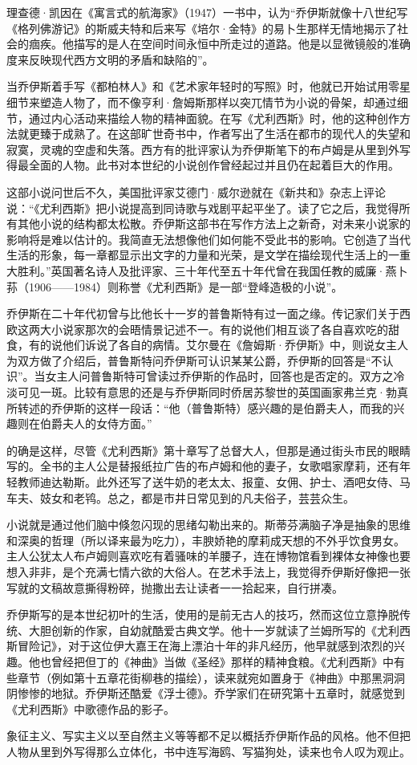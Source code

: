 \par 理查德·凯因在《寓言式的航海家》（1947）一书中，认为“乔伊斯就像十八世纪写《格列佛游记》的斯威夫特和后来写《培尔·金特》的易卜生那样无情地揭示了社会的痼疾。他描写的是人在空间时间永恒中所走过的道路。他是以显微镜般的准确度来反映现代西方文明的矛盾和缺陷的”。
\par 当乔伊斯着手写《都柏林人》和《艺术家年轻时的写照》时，他就已开始试用零星细节来塑造人物了，而不像亨利·詹姆斯那样以突兀情节为小说的骨架，却通过细节，通过内心活动来描绘人物的精神面貌。在写《尤利西斯》时，他的这种创作方法就更臻于成熟了。在这部旷世奇书中，作者写出了生活在都市的现代人的失望和寂寞，灵魂的空虚和失落。西方有的批评家认为乔伊斯笔下的布卢姆是从里到外写得最全面的人物。此书对本世纪的小说创作曾经起过并且仍在起着巨大的作用。
\par 这部小说问世后不久，美国批评家艾德门·威尔逊就在《新共和》杂志上评论说：“《尤利西斯》把小说提高到同诗歌与戏剧平起平坐了。读了它之后，我觉得所有其他小说的结构都太松散。乔伊斯这部书在写作方法上之新奇，对未来小说家的影响将是难以估计的。我简直无法想像他们如何能不受此书的影响。它创造了当代生活的形象，每一章都显示出文字的力量和光荣，是文学在描绘现代生活上的一重大胜利。”英国著名诗人及批评家、三十年代至五十年代曾在我国任教的威廉·燕卜荪（1906——1984）则称誉《尤利西斯》是一部“登峰造极的小说”。
\par 乔伊斯在二十年代初曾与比他长十一岁的普鲁斯特有过一面之缘。传记家们关于西欧这两大小说家那次的会晤情景记述不一。有的说他们相互谈了各自喜欢吃的甜食，有的说他们诉说了各自的病情。艾尔曼在《詹姆斯·乔伊斯》中，则说女主人为双方做了介绍后，普鲁斯特问乔伊斯可认识某某公爵，乔伊斯的回答是“不认识”。当女主人问普鲁斯特可曾读过乔伊斯的作品时，回答也是否定的。双方之冷淡可见一斑。比较有意思的还是与乔伊斯同时侨居苏黎世的英国画家弗兰克·勃真所转述的乔伊斯的这样一段话：“他（普鲁斯特）感兴趣的是伯爵夫人，而我的兴趣则在伯爵夫人的女侍方面。”
\par 的确是这样，尽管《尤利西斯》第十章写了总督大人，但那是通过街头市民的眼睛写的。全书的主人公是替报纸拉广告的布卢姆和他的妻子，女歌唱家摩莉，还有年轻教师迪达勒斯。此外还写了送牛奶的老太太、报童、女佣、护士、酒吧女侍、马车夫、妓女和老鸨。总之，都是市井日常见到的凡夫俗子，芸芸众生。
\par 小说就是通过他们脑中倏忽闪现的思绪勾勒出来的。斯蒂芬满脑子净是抽象的思维和深奥的哲理（所以译来最为吃力），丰腴娇艳的摩莉成天想的不外乎饮食男女。主人公犹太人布卢姆则喜欢吃有着骚味的羊腰子，连在博物馆看到裸体女神像也要想入非非，是个充满七情六欲的大俗人。在艺术手法上，我觉得乔伊斯好像把一张写就的文稿故意撕得粉碎，抛撒出去让读者一一拾起来，自行拼凑。
\par 乔伊斯写的是本世纪初叶的生活，使用的是前无古人的技巧，然而这位立意挣脱传统、大胆创新的作家，自幼就酷爱古典文学。他十一岁就读了兰姆所写的《尤利西斯冒险记》，对于这位伊大嘉王在海上漂泊十年的非凡经历，他早就感到浓烈的兴趣。他也曾经把但丁的《神曲》当做《圣经》那样的精神食粮。《尤利西斯》中有些章节（例如第十五章花街柳巷的描绘），读来就宛如置身于《神曲》中那黑洞洞阴惨惨的地狱。乔伊斯还酷爱《浮士德》。乔学家们在研究第十五章时，就感觉到《尤利西斯》中歌德作品的影子。
\par 象征主义、写实主义以至自然主义等等都不足以概括乔伊斯作品的风格。他不但把人物从里到外写得那么立体化，书中连写海鸥、写猫狗处，读来也令人叹为观止。



